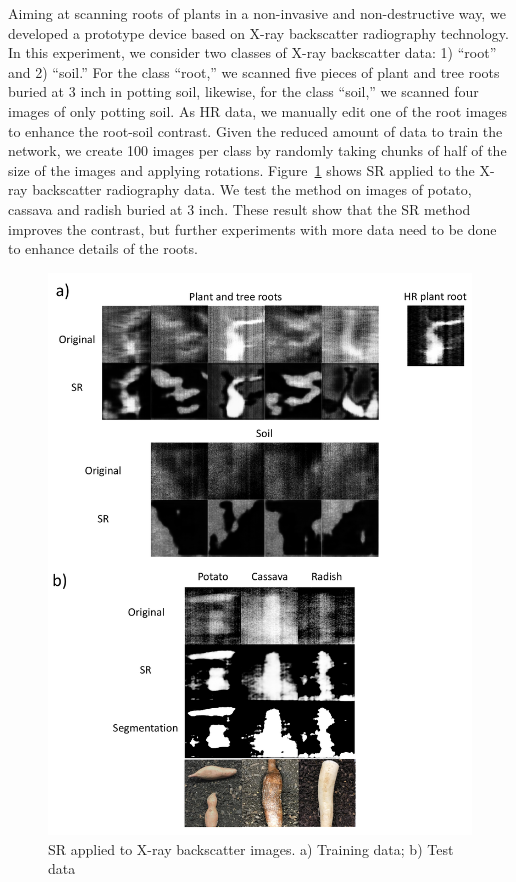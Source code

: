 \documentclass[10pt,twocolumn,letterpaper]{article}
\begin{document}
Aiming at scanning roots of plants in a non-invasive and non-destructive way, we developed a prototype device based on X-ray backscatter radiography technology. In this experiment, we consider two classes of X-ray backscatter data: 1) ``root'' and 2) ``soil.'' For the class ``root,'' we scanned five pieces of plant and tree roots buried at 3 inch in potting soil, likewise, for the class ``soil,'' we scanned four images of only potting soil. As HR data, we manually edit one of the root images to enhance the root-soil contrast. Given the reduced amount of data to train the network, we create 100 images per class by randomly taking chunks of half of the size of the images and applying rotations. Figure~\ref{fig:srtest} shows SR applied to the X-ray backscatter radiography data. We test the method on images of potato, cassava and radish buried at 3 inch. These result show that the SR method improves the contrast, but further experiments with more data need to be done to enhance details of the roots.

\begin{figure}[h]
\begin{center}
\includegraphics[scale=0.70]{results/srxray.pdf}
\end{center}
   \caption{SR applied to X-ray backscatter images. a) Training data; b) Test data}
\label{fig:srtest}
\end{figure}
\end{document}
